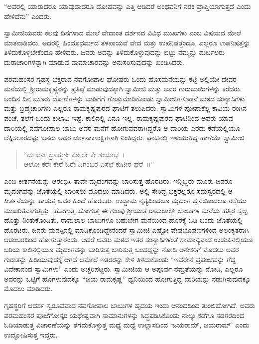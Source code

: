 “ಅವರಲ್ಲಿ ಯಾರಾದರೂ ಯಾವುದಾದರೂ ದೋಷವನ್ನು ಎತ್ತಿ ಆಡಿದರೆ ಅಂಥವನಿಗೆ ನರಕ ಪ್ರಾಪ್ತಿಯಾಗುತ್ತದೆ ಎಂದು ಹೇಳಿದೆನು” ಎಂದರು. 

 ಸ್ವಾಮೀಜಿಯವರು ಕೆಲವು ದಿನಗಳಾದ ಮೇಲೆ ವೇದಾಂತ ದರ್ಶನದ ವಿವಿಧ ಮುಖಗಳು ಎಂಬ ವಿಷಯದ ಮೇಲೆ ಮಾತನಾಡಿದರು. ಅದರಲ್ಲಿ ಹಿಂದೂಧರ್ಮದ ತಳಪಾಯವೆ ವೇದ ಮತ್ತು ಉಪನಿಷತ್ತೆಂದೂ, ಎಲ್ಲರೂ ಉಪನಿಷತ್ತನ್ನು ತಿಳಿದುಕೊಳ್ಳಬೇಕೆಂದೂ ಹೇಳಿದರು. ಜನರು ಅದನ್ನು ತಿಳಿದುಕೊಳ್ಳುವುದನ್ನು ಬಿಟ್ಟು ನಮ್ಮನ್ನು ದುರ್ಬಲರು ದುರಾಚಾರಿಗಳನ್ನಾಗಿ ಮಾಡುವ ವಾಮಾಚಾರವನ್ನು ಅನುಸರಿಸುವುದನ್ನು ಖಂಡಿಸಿದರು. 

 ಪರಮಹಂಸರ ಗೃಹಸ್ಥ ಭಕ್ತರಾದ ನವಗೋಪಾಲ ಘೋಷರು ಒಂದು ಹೊಸಮನೆಯನ್ನು ಕಟ್ಟಿ ಅಲ್ಲಿಯೇ ದೇವರ ಮನೆಯಲ್ಲಿ ಶ‍್ರೀರಾಮಕೃಷ್ಣರನ್ನು ಪ್ರತಿಷ್ಠೆ ಮಾಡುವುದಕ್ಕಾಗಿ ಸ್ವಾಮೀಜಿ ಮತ್ತು ಅವರ ಗುರುಭಾಯಿಗಳನ್ನು ಕರೆದರು. ಅಂದಿನ ದಿನ ಮೂರು ದೋಣಿಗಳನ್ನು ಬಾಡಿಗೆಗೆ ಗೊತ್ತುಮಾಡಿಕೊಂಡು ಸ್ವಾಮೀಜಿಗಳೊಡನೆ ಮಠದ ಸಂನ್ಯಾಸಿಗಳು ಮತ್ತು ಬ್ರಹ್ಮಚಾರಿಗಳು ಎಲ್ಲರೂ ರಾಮಕೃಷ್ಣಪುರದ ಘಾಟಿಗೆ ತಲುಪಿದರು. ಸ್ವಾಮಿಗಳ ಪೋಷಾಕೆಲ್ಲ ಕಾವಿಯ ರಂಗಿನ ಪಂಚೆ, ತಲೆಗೆ ಒಂದು ಕುಲಾವಿ ಇಷ್ಟೆ. ಕಾಲಿನಲ್ಲಿ ಏನೂ ಇಲ್ಲ. ರಾಮಕೃಷ್ಣಪುರದ ಘಾಟಿನಿಂದ ಅವರು ಯಾವ ದಾರಿಯಲ್ಲಿ ನವಗೋಪಾಲ ಬಾಬು ಅವರ ಮನೆಗೆ ಹೋಗುವವರಾಗಿದ್ದರೊ ಆ ದಾರಿಯ ಎರಡು ಕಡೆಯಲ್ಲಿಯೂ ಲೆಕ್ಕಿಸಲಾರದಷ್ಟು ಜನರು ಅವರ ದರ್ಶನಾಕಾಂಕ್ಷಿಗಳಾಗಿ ನಿಂತಿದ್ದರು. ಘಾಟಿನಲ್ಲಿ ಇಳಿಯುತ್ತಿದ್ದ ಹಾಗೆಯೇ ಸ್ವಾಮೀಜಿ

\begin{verse}
“ದುಃಖನೀ ಬ್ರಾಹ್ಮಣೀ ಕೋಲೇ ಕೇ ಶುಯೇಛೆ~।\\ಆಲೋ ಕರೇ ಕೇರೆ ಓರೇ ದಿಗಂಬರ ಏಸೆಛೆ ಕುಟೀರ ಘರೆ~॥”
\end{verse}

 ಎಂಬ ಕೀರ್ತನೆಯನ್ನು ಆರಂಭಿಸಿ ತಾವೇ ಮೃದಂಗವನ್ನು ಬಾರಿಸುತ್ತ ಹೊರಟರು. ಇನ್ನಿಬ್ಬರು ಮೂರು ಜನರೂ‌ ಮೃದಂಗವನ್ನು ಜೊತೆಯಲ್ಲಿ ಬಾರಿಸಲು ಮೊದಲು ಮಾಡಿದರು. ಅಲ್ಲಿ ಸೇರಿದ್ದ ಭಕ್ತರೆಲ್ಲರೂ‌ ಸಮಸ್ವರದಲ್ಲಿ ಆ ಕೀರ್ತನೆಯನ್ನು ಹಾಡುತ್ತ ಅವರ ಹಿಂದೆ ಹೊರಟರು. ಉದ್ದಾಮ ನೃತ್ಯದಿಂದಲೂ ಮೃದಂಗ ಧ್ವನಿಯಿಂದಲೂ ರಸ್ತೆಯು ಮುಖರಿತವಾಗುತ್ತಿತ್ತು. ಹೋಗುತ್ತ ಹೋಗುತ್ತ ಈ ಗುಂಪು ಶ‍್ರೀಯುತ ರಾಮಲಾಲ್ ಬಾಬುಗಳ ಮನೆಯ ಹತ್ತಿರ ಸ್ವಲ್ಪ ಹೊತ್ತು ನಿಂತುಕೊಂಡಿತು. ರಾಮಲಾಲ ಬಾಬುಗಳೂ ಬಹುಬೇಗ ಮನೆಯಿಂದ ಹೊರಕ್ಕೆ ಓಡಿ ಬಂದು ಜೊತೆಯಲ್ಲಿ ಹೊರಟರು. ಜನರು ಮನಸ್ಸಿನಲ್ಲಿ ಮಾಡಿಕೊಂಡಿದ್ದೇನೆಂದರೆ ಸ್ವಾಮೀಜಿ ಎಷ್ಟೋ ವೇಷಭೂಷಣಗಳಿಂದ ಅಲಂಕೃತರಾಗಿ ಆಡಂಬರದಿಂದ ಹೋಗುತ್ತಾರೆಂದು. ಆದರೆ ಅವರು ಮಠದ ಇತರ ಸಂನ್ಯಾಸಿಗಳಂತೆ ಸಾಮಾನ್ಯವಾದ ಉಡುಪಿನಲ್ಲಿಯೂ ಬರಿಯ ಕಾಲಿನಲ್ಲಿಯೂ ಮೃದಂಗವನ್ನು ಬಾರಿಸುತ್ತ ಬಾರಿಸುತ್ತ ಬಂದದ್ದನ್ನು ನೋಡಿ ಅನೇಕರಿಗೆ ಮೊದಲು ಅವರ ಗುರುತನ್ನು ಹಿಡಿಯುವುದಕ್ಕೆ ಆಗದೆ ಆಮೇಲೆ ಇತರರನ್ನು ಕೇಳಿ ತಿಳಿದುಕೊಂಡು “ಇವರೇನೆ ಪ್ರಪಂಚವನ್ನು ಗೆದ್ದ ವಿವೇಕಾನಂದ ಸ್ವಾಮಿಗಳು” ಎಂದು ಅಚ್ಚರಿಪಟ್ಟರು. ಸ್ವಾಮೀಜಿಯ ಆ ಅಪೂರ್ವ ನಮ್ರತೆಯನ್ನು ನೋಡಿ, ಎಲ್ಲರೂ ಅವರನ್ನು ಒಟ್ಟಿಗೆ ಹೊಗಳುವುದಕ್ಕೂ “ಜಯ ರಾಮಕೃಷ್ಣ” ಧ್ವನಿಯಿಂದ ಹೋಗುತ್ತಿದ್ದ ದಾರಿಯನ್ನು ನಡುಗಿಸುವುದಕ್ಕೂ ಮೊದಲು ಮಾಡಿದರು. 

 ಗೃಹಸ್ಥರಿಗೆ ಆದರ್ಶ ಸ್ವರೂಪವಾದ ನವಗೋಪಾಲ ಬಾಬುಗಳ ಹೃದಯ ಇಂದು ಆನಂದದಿಂದ ತುಂಬಿಹೋಗಿದೆ. ಅವರು ಪರಮಹಂಸರ ಪೂಜೆಗೋಸ್ಕರ ಯಥೇಷ್ಟವಾಗಿ ಸಾಮಾನುಗಳನ್ನು ಸಿದ್ಧಪಡಿಸಿಕೊಂಡು ನಾಲ್ಕು ಕಡೆಗೂ ಸಡಗರದಿಂದ ಓಡಿಯಾಡುತ್ತ ವಿಚಾರಣೆಯನ್ನು ತೆಗೆದುಕೊಳ್ಳುತ್ತ ಮಧ್ಯೆ ಮಧ್ಯೆ ಉಲ್ಲಾಸದಿಂದ ‘ಜಯರಾಮ್, ಜಯರಾಮ್’ ಎಂದು ಉದ್ಘೋಷಿಸುತ್ತ ಇದ್ದರು. 

